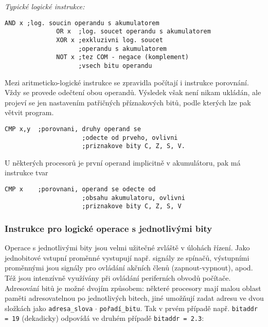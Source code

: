           \emph{Typické logické instrukce:}
            \begin{lstlisting}[gobble=10]
              AND x ;log. soucin operandu s akumulatorem
              OR x  ;log. soucet operandu s akumulatorem
              XOR x ;exkluzivni log. soucet 
                    ;operandu s akumulatorem
              NOT x ;tez COM - negace (komplement) 
                    ;vsech bitu operandu
            \end{lstlisting}
      
          Mezi aritmeticko-logické instrukce se zpravidla počítají i instrukce porovnání. Vždy se 
          provede odečtení obou operandů. Výsledek však není nikam ukládán, ale projeví se jen 
          nastavením patřičných příznakových bitů, podle kterých lze pak větvit program.
       
          \begin{lstlisting}[gobble=10]
            CMP x,y  ;porovnani, druhy operand se 
                     ;odecte od prveho, ovlivni
                     ;priznakove bity C, Z, S, V.
          \end{lstlisting}
       
          U některých procesorů je první operand implicitně v akumulátoru, pak má instrukce tvar
       
          \begin{lstlisting}[gobble=10]
            CMP x    ;porovnani, operand se odecte od 
                     ;obsahu akumulatoru, ovlivni 
                     ;priznakove bity C, Z, S, V
          \end{lstlisting}

        \subsubsection{Instrukce pro logické operace s jednotlivými bity}      
          Operace s jednotlivými bity jsou velmi užitečné zvláště v úlohách řízení. Jako 
          jednobitové vstupní proměnné vystupují např. signály ze spínačů, výstupními proměnnými 
          jsou signály pro ovládání akčních členů (zapnout-vypnout), apod. Též jsou intenzívně 
          využívány při ovládání periferních obvodů počítače. Adresování bitů je možné dvojím 
          způsobem: některé procesory mají malou oblast paměti adresovatelnou po jednotlivých 
          bitech, jiné umožňují zadat adresu ve dvou složkách jako \texttt{adresa\_slova} \(\cdot\) 
          \texttt{pořadí\_bitu}. Tak v prvém případě např. \texttt{bitaddr = 19} (dekadicky) 
          odpovídá ve druhém případě \texttt{bitaddr = 2.3}:


